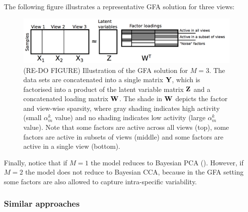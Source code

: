 The following figure illustrates a representative GFA solution for three views:
\begin{figure}[h]
	\centering
	\includegraphics[width=1.0\linewidth]{GFA}
	\caption{(RE-DO FIGURE) Illustration of the GFA solution for $M=3$. The data sets are concatenated into a single matrix ${\bf Y}$, which is factorised into a product of the latent variable matrix ${\bf Z}$ and a concatenated loading matrix ${\bf W}$. The shade in ${\bf W}$ depicts the factor and view-wise sparsity, where gray shading indicates high activity (small $\alpha_m^k$ value) and no shading indicates low activity (large $\alpha_m^k$ value). Note that some factors are active across all views (top), some factors are active in subsets of views (middle) and some factors are active in a single view (bottom).}
	\label{fig:intro:gfa}
\end{figure}

Finally, notice that if $M=1$ the model reduces to Bayesian PCA (). However, if $M=2$ the model does not reduce to Bayesian CCA, because in the GFA setting some factors are also allowed to capture intra-specific variability.

\subsubsection{Similar approaches}




